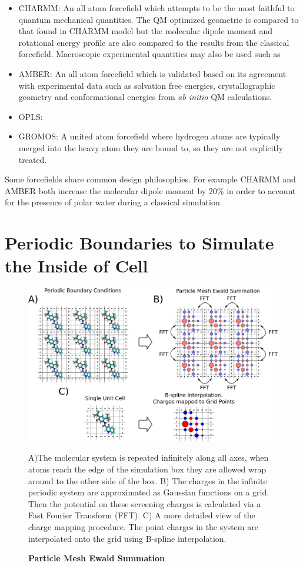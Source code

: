 \begin{itemize}
	\item CHARMM: An all atom forcefield which attempts to be the most faithful to quantum mechanical quantities. The QM optimized geometrie is compared to that found in CHARMM model but the molecular dipole moment and rotational energy profile are also compared to the results from the classical forcefield. Macroscopic experimental quantities may also be used such as 
	\item AMBER: An all atom forcefield which is validated based on its agreement with experimental data such as solvation free energies, crystallographic geometry and conformational energies from \textit{ab initio} QM calculations.
	\item OPLS:
	\item GROMOS: A united atom forcefield where hydrogen atoms are typically merged into the heavy atom they are bound to, so they are not explicitly treated.

\end{itemize}
Some forcefields share common design philosophies. For example CHARMM and AMBER both increase the molecular dipole moment by 20\% in order to account for the presence of polar water during a classical simulation.


\section{Periodic Boundaries to Simulate the Inside of Cell}
\begin{figure}
	\begin{center}
		\includegraphics[width=\textwidth]{figures/PME_miro.pdf}
	\end{center}
	\captionsetup{singlelinecheck = false, justification=raggedright}
	\caption[Particle Mesh Ewald Summation] {\textbf{Particle Mesh Ewald Summation}}{A)The molecular system is repeated infinitely along all axes, when atoms reach the edge of the simulation box they are allowed wrap around to the other side of the box. B) The charges in the infinite periodic system are approximated as Gaussian functions on a grid. Then the potential on these screening charges is calculated via a Fast Fourier Transform (FFT). C) A more detailed view of the charge mapping procedure. The point charges in the system are interpolated onto the grid using B-spline interpolation. }
	\label{PME_illustration}
\end{figure}


